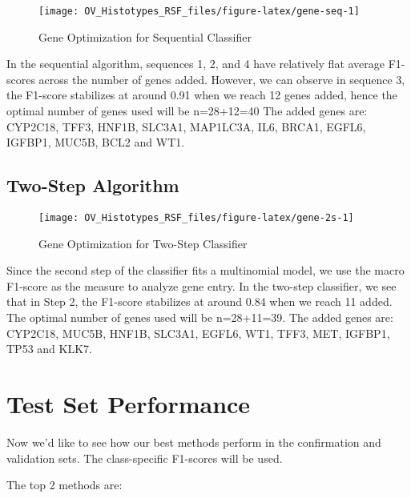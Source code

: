 \documentclass[
]{report}
\begin{document}
\begin{figure}[H]

{\centering \texttt{[image: OV\_Histotypes\_RSF\_files/figure-latex/gene-seq-1]} 

}

\caption{Gene Optimization for Sequential Classifier}\label{fig:gene-seq}
\end{figure}

In the sequential algorithm, sequences 1, 2, and 4 have relatively flat average F1-scores across the number of genes added. However, we can observe in sequence 3, the F1-score stabilizes at around 0.91 when we reach 12 genes added, hence the optimal number of genes used will be n=28+12=40 The added genes are: CYP2C18, TFF3, HNF1B, SLC3A1, MAP1LC3A, IL6, BRCA1, EGFL6, IGFBP1, MUC5B, BCL2 and WT1.

\subsection{Two-Step Algorithm}\label{two-step-algorithm-1}

\begin{figure}[H]

{\centering \texttt{[image: OV\_Histotypes\_RSF\_files/figure-latex/gene-2s-1]} 

}

\caption{Gene Optimization for Two-Step Classifier}\label{fig:gene-2s}
\end{figure}

Since the second step of the classifier fits a multinomial model, we use the macro F1-score as the measure to analyze gene entry. In the two-step classifier, we see that in Step 2, the F1-score stabilizes at around 0.84 when we reach 11 added. The optimal number of genes used will be n=28+11=39. The added genes are: CYP2C18, MUC5B, HNF1B, SLC3A1, EGFL6, WT1, TFF3, MET, IGFBP1, TP53 and KLK7.

\section{Test Set Performance}\label{test-set-performance}

Now we'd like to see how our best methods perform in the confirmation and validation sets. The class-specific F1-scores will be used.

The top 2 methods are:
\end{document}
